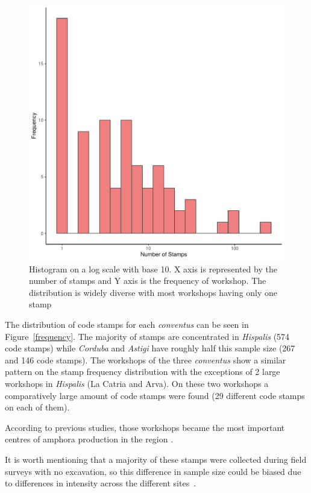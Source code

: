 \documentclass[review]{elsarticle}
\begin{document}
\begin{figure}[htp]
	\centering
\includegraphics[width=\linewidth]{figs/frequencystamp.pdf}
\caption{Histogram on a log scale with base 10. X axis is represented by the number of stamps and Y axis is the frequency of workshop. The distribution is widely diverse with most workshops having only one stamp}
\label{stamps}
\end{figure} 


The distribution of code stamps for each \textit{conventus} can be seen in Figure~\ref{frequency}. The majority of stamps are concentrated in \textit{Hispalis} (574 code stamps) while \textit{Corduba} and \textit{Astigi} have roughly half this sample size (267 and 146 code stamps). The workshops of the three \textit{conventus} show a similar pattern on the stamp frequency distribution with the exceptions of 2 large workshops in \textit{Hispalis} (La Catria and Arva). On these two workshops a comparatively large amount of code stamps were found (29 different code stamps on each of them).

According to previous studies, those workshops became the most important centres of amphora production in the region \citep{rodriguez_economioleicola_1977,
arva_1997}.

It is worth mentioning that a majority of these stamps were collected during field surveys with no excavation, so this difference in sample size could be biased due to differences in intensity across the different sites~\citep{arva_1997}.
 
\end{document}
